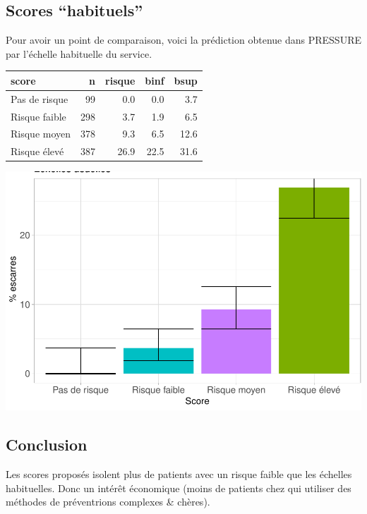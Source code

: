 \documentclass[]{article}
\begin{document}
\hypertarget{scores-habituels}{%
\subsection{Scores ``habituels''}\label{scores-habituels}}

Pour avoir un point de comparaison, voici la prédiction obtenue dans
PRESSURE par l'échelle habituelle du service.

\begin{longtable}[]{@{}lrrrr@{}}
\toprule
score & n & risque & binf & bsup\tabularnewline
\midrule
\endhead
Pas de risque & 99 & 0.0 & 0.0 & 3.7\tabularnewline
Risque faible & 298 & 3.7 & 1.9 & 6.5\tabularnewline
Risque moyen & 378 & 9.3 & 6.5 & 12.6\tabularnewline
Risque élevé & 387 & 26.9 & 22.5 & 31.6\tabularnewline
\bottomrule
\end{longtable}

\includegraphics{book_escarre_files/figure-latex/schab-1.pdf}

\hypertarget{conclusion}{%
\subsection{Conclusion}\label{conclusion}}

Les scores proposés isolent plus de patients avec un risque faible que
les échelles habituelles. Donc un intérêt économique (moins de patients
chez qui utiliser des méthodes de préventrions complexes \& chères).
\end{document}
